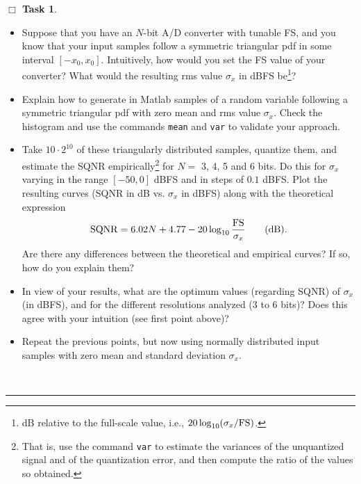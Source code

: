\documentclass[11pt]{article}
\newcounter{ntask}
\newtheorem{task}[ntask]{$\Box$ Task}
\newenvironment{Task}
{\begin{task}\end{task} \vspace{-0.1in}\sf}
{\hfill \QED}
\def\QED{~\rule[-1pt]{5pt}{5pt}\par\medskip}
\begin{document}
\newpage
\begin{Task}
\begin{itemize}

\item Suppose that you have an $N$-bit A/D converter with tunable FS, and you know that your input samples 
follow a symmetric triangular pdf in some interval $[-x_0, x_0]$. Intuitively, how would you set the FS value of your converter? What would the resulting rms value $\sigma_x$ in dBFS be\footnote{dB relative to the full-scale value, i.e., $20\log_{10}(\sigma_x/{\rm FS})$.}?

\item Explain how to generate in Matlab samples of a random variable following a symmetric triangular pdf with zero mean and rms value $\sigma_x$. Check the histogram and use the commands {\tt mean} and {\tt var} to validate your approach.

\item Take $10\cdot 2^{10}$ of these triangularly distributed samples, quantize them, and estimate the SQNR empirically\footnote{That is, use the command {\tt var} to estimate the variances of the unquantized signal and of the quantization error, and then compute the ratio of the values so obtained.} for $N=$ 3, 4, 5 and 6 bits. Do this for $\sigma_x$ varying in the range $[-50, 0]$ dBFS and in steps of $0.1$ dBFS. Plot the resulting curves (SQNR in dB vs. $\sigma_x$ in dBFS) along with the theoretical expression
\begin{equation}\label{eq:sqnr}
 {\rm SQNR} = 6.02 N + 4.77-20\log_{10}\frac{\rm FS}{\sigma_x} \qquad \mbox{(dB).} 
\end{equation}
Are there any differences between the theoretical and empirical curves? If so, how do you explain them? 

\item In view of your results, what are the optimum values (regarding SQNR) of $\sigma_x$ (in dBFS), and for the different resolutions analyzed (3 to 6 bits)? Does this agree with your intuition (see first point above)?


\item Repeat the previous points, but now using normally distributed input samples with zero mean and standard deviation $\sigma_x$.

\end{itemize}


\vspace*{-0.5cm}
\end{Task}
\end{document}
